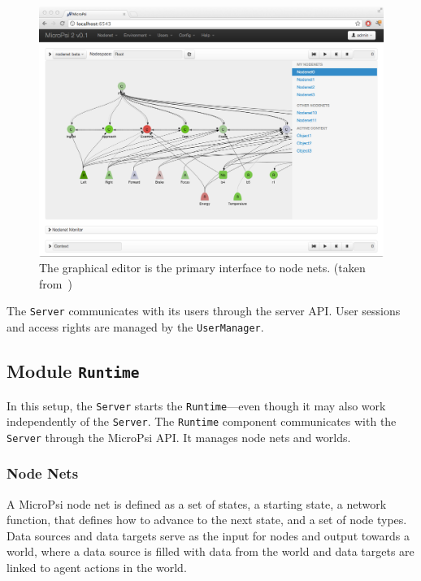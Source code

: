 \begin{figure}[h]
  \centering
    \includegraphics[width=13cm]{graphics/micropsi2_nodenet}
  \caption{The graphical editor is the primary interface to node nets. (taken from~\cite{conf/agi/Bach12})}
  \label{micropsi2_nodenet}
\end{figure}

The \texttt{Server} communicates with its users through the server API. User sessions and access rights are managed by the \texttt{UserManager}.
   
        \subsection{Module \texttt{Runtime}}
In this setup, the \texttt{Server} starts the \texttt{Runtime}---even though it may also work independently of the \texttt{Server}. The \texttt{Runtime} component communicates with the \texttt{Server} through the MicroPsi API. It manages node nets and worlds.

        \subsubsection{Node Nets}

        
A MicroPsi node net is defined as a set of states, a starting state, a network function, that defines how to advance to the next state, and a set of node types. Data sources and data targets serve as the input for nodes and output towards a world, where a data source is filled with data from the world and data targets are linked to agent actions in the world.

